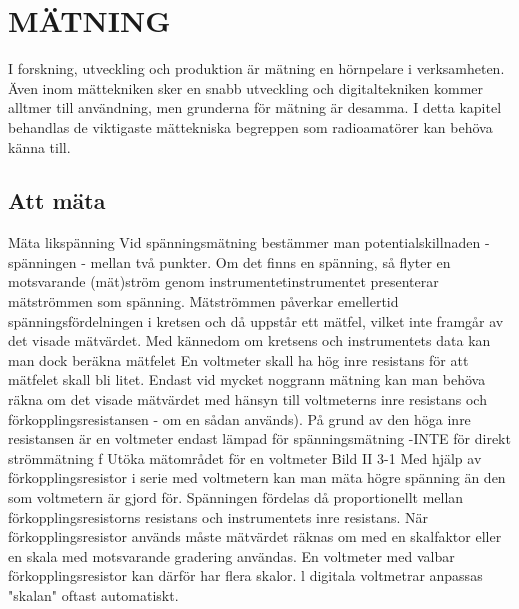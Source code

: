 \chapter{MÄTNING}

I forskning, utveckling och produktion är mätning en hörnpelare i verksamheten. Även
inom mättekniken sker en snabb utveckling och digitaltekniken kommer alltmer till
användning, men grunderna för mätning är desamma. I detta kapitel behandlas de viktigaste
mättekniska begreppen som radioamatörer kan behöva känna till.

\section{Att mäta}

Mäta likspänning
Vid spänningsmätning bestämmer man potentialskillnaden -spänningen - mellan två
punkter. Om det finns en spänning, så flyter
en motsvarande (mät)ström genom instrumentetinstrumentet presenterar mätströmmen som spänning.
Mätströmmen påverkar emellertid spänningsfördelningen i kretsen och då uppstår
ett mätfel, vilket inte framgår av det visade
mätvärdet. Med kännedom om kretsens och
instrumentets data kan man dock beräkna
mätfelet En voltmeter skall ha hög inre
resistans för att mätfelet skall bli litet.
Endast vid mycket noggrann mätning
kan man behöva räkna om det visade mätvärdet med hänsyn till voltmeterns inre resistans och förkopplingsresistansen - om
en sådan används).
På grund av den höga inre resistansen är
en voltmeter endast lämpad för spänningsmätning -INTE för direkt strömmätning f
Utöka mätområdet för en voltmeter
Bild II 3-1
Med hjälp av förkopplingsresistor i serie
med voltmetern kan man mäta högre spänning än den som voltmetern är gjord för.
Spänningen fördelas då proportionellt mellan förkopplingsresistorns resistans och instrumentets inre resistans.
När förkopplingsresistor används måste
mätvärdet räknas om med en skalfaktor eller
en skala med motsvarande gradering användas. En voltmeter med valbar förkopplingsresistor kan därför har flera skalor. l
digitala voltmetrar anpassas "skalan" oftast
automatiskt.


